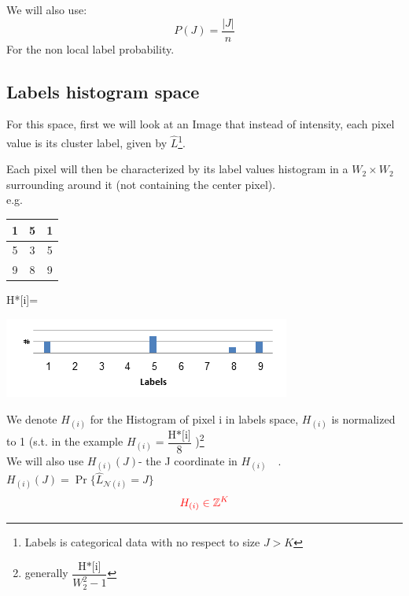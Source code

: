 \documentclass{article}
\begin{document}
We will also use:
\begin{equation}
P(J)=\frac {|J\vert}{n}
\end{equation} 
For the non local label probability.
\subsection{Labels histogram space}
For this space, first we will look at an Image that instead of intensity, each pixel value is its cluster label, given by $\hat L$\footnote{Labels is categorical data with no respect to size $ J>K $}.

Each pixel will then be characterized by its label values histogram in a $W_2\times W_2$ surrounding around it (not containing the center pixel).\\
e.g. 
\begin{multicols}{3}
\begin{tabular}{|c|c|c|}\hline
1&5&1\\	\hline
5&\colorbox{lightred}{3}&5\\ \hline
9&8&9\\ \hline
\end{tabular}

\begin{flushright}
	H*[i]=
\end{flushright}	
\includegraphics[width=1.2\linewidth]{histogram.png}
\end{multicols}
We denote $ H_{(i)} $ for the Histogram of pixel i in labels space, $ H_{(i)} $  is normalized to 1 (s.t. in the example $ H_{(i)} = \dfrac{\text{H*[i]}}{8}$ )\footnote{generally $\dfrac{\text{H*[i]}}{W_2^2-1}$ }\\
We will also use  $ H_{(i)}(J) $- the J coordinate in $ H_{(i)} \quad $. $ H_{(i)}(J)=\Pr \{\widehat{L}_{\mathcal{N}(i)}=J \} $
\begin{equation*}
\color{red} H_{(i)}\in \mathbb{Z}^K 
\end{equation*}
\end{document}
